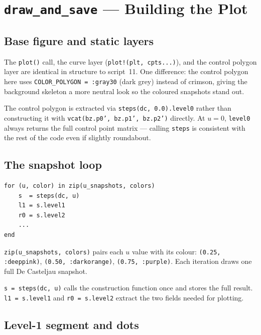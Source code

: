 \documentclass[12pt, a4paper]{article}
\newcommand{\cd}[1]{\texttt{#1}}
\begin{document}
\section{\texttt{draw\_and\_save} --- Building the Plot}

\subsection{Base figure and static layers}

The \cd{plot()} call, the curve layer (\cd{plot!(plt, cpts...)}),
and the control polygon layer are identical in structure
to script~11.
One difference: the control polygon here uses
\cd{COLOR\_POLYGON = :gray30} (dark grey) instead of
crimson, giving the background skeleton a more neutral look
so the coloured snapshots stand out.

The control polygon is extracted via \cd{steps(dc, 0.0).level0}
rather than constructing it with \cd{vcat(bz.p0', bz.p1', bz.p2')}
directly.
At $u=0$, \cd{level0} always returns the full control
point matrix --- calling \cd{steps} is consistent with
the rest of the code even if slightly roundabout.

\subsection{The snapshot loop}

\begin{verbatim}
for (u, color) in zip(u_snapshots, colors)
    s  = steps(dc, u)
    l1 = s.level1
    r0 = s.level2
    ...
end
\end{verbatim}

\cd{zip(u\_snapshots, colors)} pairs each $u$ value with
its colour: \cd{(0.25, :deeppink)}, \cd{(0.50, :darkorange)},
\cd{(0.75, :purple)}.
Each iteration draws one full De Casteljau snapshot.

\cd{s = steps(dc, u)} calls the construction function once
and stores the full result.
\cd{l1 = s.level1} and \cd{r0 = s.level2} extract the
two fields needed for plotting.

\subsection{Level-1 segment and dots}
\end{document}
